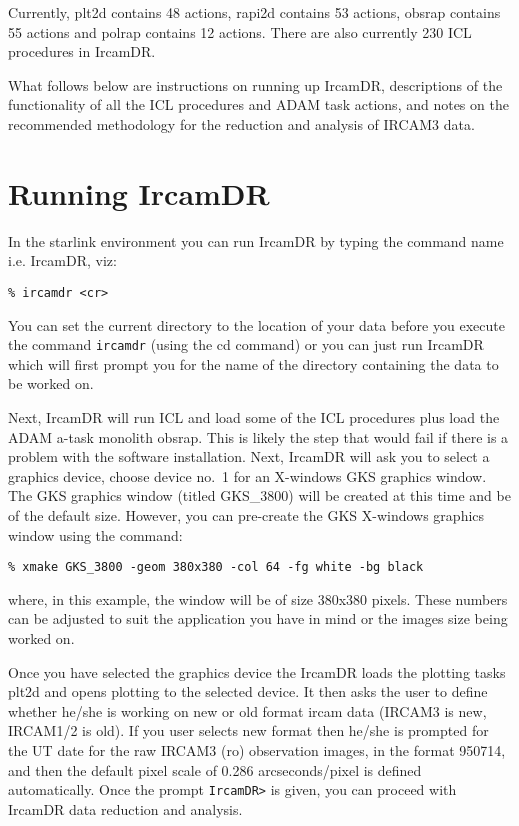 Currently, plt2d contains 48 actions, rapi2d contains 53 actions, obsrap
contains 55 actions and polrap contains 12 actions. There are also
currently 230 ICL procedures in {\sc IrcamDR}.

What follows below are instructions on running up
{\sc IrcamDR}, descriptions of the functionality of all the ICL procedures and
{\sc ADAM} task actions, and notes on the recommended methodology for the
reduction and analysis of {\sc IRCAM3} data.

\section{Running {\sc IrcamDR}}

In the starlink environment you can run {\sc IrcamDR} by typing the command 
name i.e. {\sc IrcamDR}, viz:

\begin{verbatim}
% ircamdr <cr>
\end{verbatim}

You can set the current directory to the location of your data before you
execute the command \verb+ircamdr+ (using the cd command) or you can just run
{\sc IrcamDR} which will first prompt you for the name of the directory
containing the data to be worked on.  

Next, {\sc IrcamDR} will run ICL and load some of the ICL procedures plus load
the {\sc ADAM} \mbox{a-task} monolith obsrap.  This is likely the step that would fail
if there is a problem with the software installation. Next,
{\sc IrcamDR} will ask you to select a graphics device, choose device no.\ 1 for
an X-windows GKS graphics window.  The GKS graphics window (titled
GKS\_3800) will be created at this time and be of the default size.
However, you can pre-create the GKS X-windows graphics window using the
command:

\begin{verbatim}
% xmake GKS_3800 -geom 380x380 -col 64 -fg white -bg black
\end{verbatim}

where, in this example, the window will be of size 380x380 pixels.  These
numbers can be adjusted to suit the application you have in mind or the
images size being worked on.

Once you have selected the graphics device the {\sc IrcamDR} loads the plotting
tasks plt2d and opens plotting to the selected device.  It then asks the
user to define whether he/she is working on new or old format ircam data
({\sc IRCAM3} is new, {\sc IRCAM1/2} is old).  If you user selects new format then
he/she is prompted for the UT date for the raw {\sc IRCAM3} (ro) observation
images, in the format 950714, and then the default pixel scale of 0.286
arcseconds/pixel is defined automatically.  Once the prompt \verb+IrcamDR>+ is
given, you can proceed with {\sc IrcamDR} data reduction and analysis.

